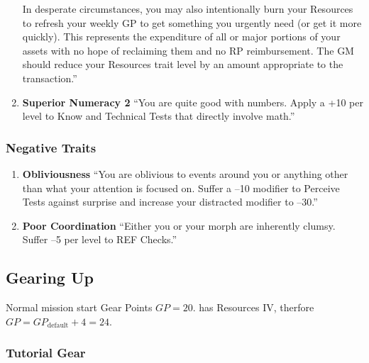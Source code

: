 \begin{enumerate}
    In desperate circumstances, you may also intentionally burn your Resources to refresh your weekly GP to get something you urgently need (or get it more quickly). This represents the expenditure of all or major portions of your assets with no hope of reclaiming them and no RP reimbursement. The GM should reduce your Resources trait level by an amount appropriate to the transaction.” \citep[pg. 76]{ep2e_1.1_2019}

    \item \textbf{\gls{Superior Numeracy} 2} “You are quite good with numbers. Apply a +10 per level to Know and Technical Tests that directly involve math.” \citep[pg. 76]{ep2e_1.1_2019}
\end{enumerate}


\subsubsection{Negative Traits}

\begin{enumerate}
    \item \textbf{\gls{Obliviousness}} “You are oblivious to events around you or anything other than what your attention is focused on. Suffer a –10 modifier to Perceive Tests against surprise and increase your distracted modifier to –30.” \citep[pg. 79]{ep2e_1.1_2019}

    \item \textbf{\gls{Poor Coordination}} “Either you or your morph are inherently clumsy. Suffer –5 per level to REF Checks.” \citep[pg. 79]{ep2e_1.1_2019}
\end{enumerate}


\subsection{Gearing Up}

Normal mission start Gear Points $GP=20$. \texttt{\egr{}}\index{\egr{}} has Resources IV, therfore $GP=GP_{\text{default}}+4=24$.

\subsubsection{Tutorial Gear}

